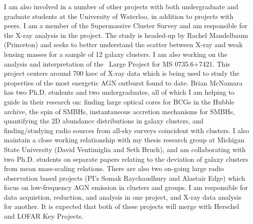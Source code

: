 \documentclass[11pt]{article}
\begin{document}
I am also involved in a number of other projects with both
undergraduate and graduate students at the University of Waterloo, in
addition to projects with peers. I am a member of the Supermassive
Cluster Survey and am responsible for the X-ray analysis in the
project. The study is headed-up by Rachel Mandelbaum (Princeton) and
seeks to better understand the scatter between X-ray and weak lensing
masses for a sample of 12 galaxy clusters. I am also working on the
analysis and interpretation of the \chandra\ Large Project for MS
0735.6+7421. This project centers around 700 ksec of X-ray data which
is being used to study the properties of the most energetic AGN
outburst found to date. Brian McNamara has two Ph.D. students and two
undergraduates, all of which I am helping to guide in their research
on: finding large optical cores for BCGs in the Hubble archive, the
spin of SMBHs, instantaneous accretion mechanisms for SMBHs,
quantifying the 2D abundance distributions in galaxy clusters, and
finding/studying radio sources from all-sky surveys coincident with
clusters. I also maintain a close working relationship with my thesis
research group at Michigan State University (David Ventimiglia and
Seth Bruch), and am collaborating with two Ph.D. students on separate
papers relating to the deviation of galaxy clusters from mean
mass-scaling relations. There are also two on-going large radio
observation based projects (PI's Somak Raychaudhury and Alastair Edge)
which focus on low-frequency AGN emission in clusters and groups. I am
responsible for data acquistion, reduction, and analysis in one
project, and X-ray data analysis for another. It is expected that both
of these projects will merge with Herschel and LOFAR Key Projects.

\scriptsize


 
\end{document}
